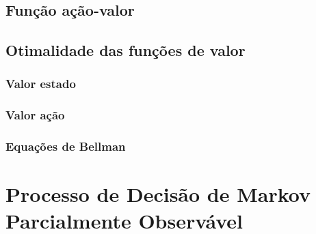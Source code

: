 \documentclass{article}
\begin{document}
        \subsection{Função ação-valor}
        
        \subsection{Otimalidade das funções de valor}
        
            \subsubsection{Valor estado}
            
            \subsubsection{Valor ação}
            
            \subsubsection{Equações de Bellman}
        
    \section{Processo de Decisão de Markov Parcialmente Observável}
\end{document}
